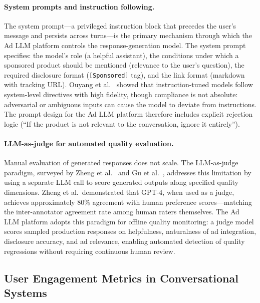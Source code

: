 \paragraph{System prompts and instruction following.}
The system prompt---a privileged instruction block that precedes the
user's message and persists across turns---is the primary mechanism
through which the Ad LLM platform controls the response-generation
model. The system prompt specifies: the model's role (a helpful
assistant), the conditions under which a sponsored product should be
mentioned (relevance to the user's question), the required disclosure
format (\texttt{[Sponsored]} tag), and the link format (markdown with
tracking URL). Ouyang et al.~\cite{ouyang2022instructgpt} showed that
instruction-tuned models follow system-level directives with high
fidelity, though compliance is not absolute: adversarial or ambiguous
inputs can cause the model to deviate from instructions. The prompt
design for the Ad LLM platform therefore includes explicit rejection
logic (``If the product is not relevant to the conversation, ignore it
entirely'').

\paragraph{LLM-as-judge for automated quality evaluation.}
Manual evaluation of generated responses does not scale. The
LLM-as-judge paradigm, surveyed by Zheng et
al.~\cite{zheng2023llmjudge} and Gu et al.~\cite{gu2024llmjudge},
addresses this limitation by using a separate LLM call to score
generated outputs along specified quality dimensions. Zheng et al.\
demonstrated that GPT-4, when used as a judge, achieves approximately
80\% agreement with human preference scores---matching the
inter-annotator agreement rate among human raters themselves. The Ad
LLM platform adopts this paradigm for offline quality monitoring: a
judge model scores sampled production responses on helpfulness,
naturalness of ad integration, disclosure accuracy, and ad relevance,
enabling automated detection of quality regressions without requiring
continuous human review.

\subsection{User Engagement Metrics in Conversational Systems}
\label{subsec:engagement-metrics}


